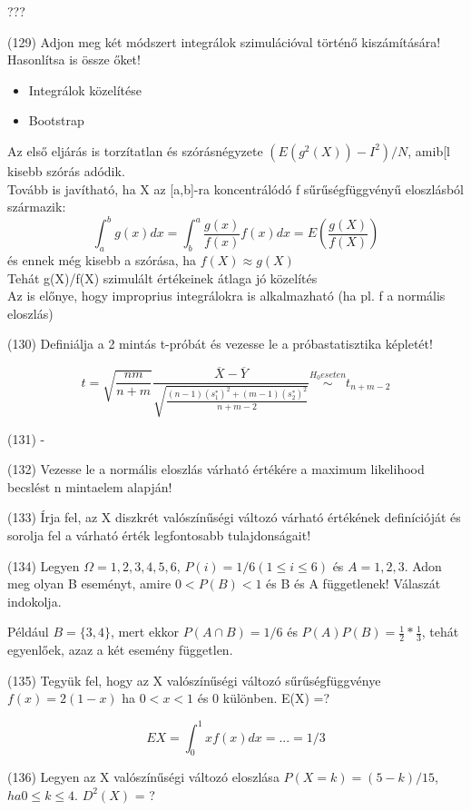 \documentclass[12p]{article}
\begin{document}
???

(129) Adjon meg két módszert integrálok szimulációval történő kiszámítására! Hasonlítsa is
össze őket!

\begin{itemize}
\item Integrálok közelítése
\item Bootstrap
\end{itemize}

Az első eljárás is torzítatlan és szórásnégyzete $(E(g^2(X)) - I^2) / N$, amib[l kisebb szórás adódik.\\
Tovább is javítható, ha X az [a,b]-ra koncentrálódó f sűrűségfüggvényű eloszlásból származik:
$$\int^b_a g(x)dx = \int^a_b \frac{g(x)}{f(x)} f(x)dx = E (\frac{g(X)}{f(X)})$$
és ennek még kisebb a szórása, ha $f(X) \approx g(X)$\\
Tehát g(X)/f(X) szimulált értékeinek átlaga jó közelítés\\
Az is előnye, hogy improprius integrálokra is alkalmazható (ha pl. f a normális eloszlás)


(130) Definiálja a 2 mintás t-próbát és vezesse le a próbastatisztika képletét!

$$t = \sqrt{\frac{nm}{n+m}}\frac{\overline{X} - \overline{Y}}{\sqrt{\frac{(n-1)(s^*_1)^2 + (m-1)(s^*_2)^2}{n+m-2}}} \stackrel{H_0 eseten}{\sim}
t_{n+m-2}$$

(131) -

(132) Vezesse le a normális eloszlás várható értékére a maximum likelihood becslést n mintaelem alapján!

(133) Írja fel, az X diszkrét valószínűségi változó várható értékének definícióját és sorolja fel
a várható érték legfontosabb tulajdonságait!

(134) Legyen $\Omega = {1, 2, 3, 4, 5, 6}$, $P(i) = 1/6 (1 \leq i \leq 6)$ és $A = {1, 2, 3}$. Adon meg olyan B
eseményt, amire $0 < P(B) < 1$ és B és A függetlenek! Válaszát indokolja.

 Például $B = \{3, 4\}$, mert ekkor $P(A \cap B) = 1/6$ és $P(A)P(B) = \frac{1}{2} * \frac{1}{3}$, tehát egyenlőek, azaz a két esemény független.

(135) Tegyük fel, hogy az X valószínűségi változó sűrűségfüggvénye $f(x) = 2(1-x)$ ha $0 < x < 1$ és 0 különben. E(X) =? 

$$EX = \int^1_0 xf(x)dx = ... = 1/3$$

(136) Legyen az X valószínűségi változó eloszlása $P(X = k) = (5 - k)/15$, $ha 0 \leq k \leq 4$. $D^2(X)$ = ?
\end{document}
